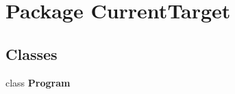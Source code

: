 \hypertarget{namespace_current_target}{\section{Package Current\-Target}
\label{namespace_current_target}
}
\subsection*{Classes}
\begin{DoxyCompactItemize}
\item 
class {\bfseries Program}
\end{DoxyCompactItemize}
